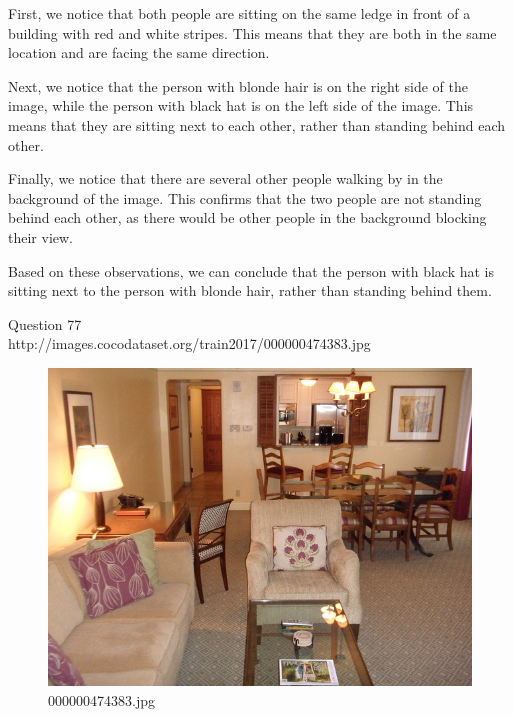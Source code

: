 \begin{enumerate}
    First, we notice that both people are sitting on the same ledge in front of a building with red and white stripes. This means that they are both in the same location and are facing the same direction.
    
    Next, we notice that the person with blonde hair is on the right side of the image, while the person with black hat is on the left side of the image. This means that they are sitting next to each other, rather than standing behind each other.
    
    Finally, we notice that there are several other people walking by in the background of the image. This confirms that the two people are not standing behind each other, as there would be other people in the background blocking their view.
    
    Based on these observations, we can conclude that the person with black hat is sitting next to the person with blonde hair, rather than standing behind them.
\end{enumerate}
Question 77\\
http://images.cocodataset.org/train2017/000000474383.jpg
\begin{figure}[h]
    \centering
    \includegraphics[width=0.8\linewidth]{../image set/hard/000000474383.jpg}
    \caption{000000474383.jpg}
\end{figure}

